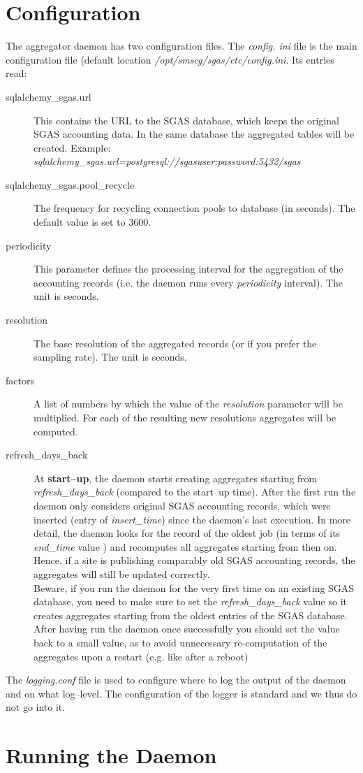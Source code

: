 \section{Configuration}
\label{configuration}
The aggregator daemon has two configuration files.
The \emph{config. ini}  file is the main configuration file  (default location 
\emph{/opt/smscg/\-sgas/etc/config.ini}. Its  entries read:
\begin{description}

\item[sqlalchemy\_sgas.url] This contains the URL to the SGAS database, which keeps the original SGAS accounting data. In the same database the aggregated tables will be created. Example: \emph{sqlalchemy\_sgas.url=postgresql://sgasuser:password\@host:5432/sgas} 
\item[sqlalchemy\_sgas.pool\_recycle] The frequency for recycling connection pools to database (in seconds). The default value is set to 3600.
\item[periodicity] This parameter defines the processing interval for the aggregation of the accounting records (i.e. the daemon 
runs every \emph{periodicity} interval). The unit is seconds. 
\item[resolution] The base resolution of the aggregated records (or if you prefer the sampling rate). The unit is seconds.
\item[factors]  A list of numbers by which the  value of the \emph{resolution} parameter will be multiplied. For each of the resulting new resolutions aggregates will be computed. 
\item[refresh\_days\_back] At \textbf{start--up}, the daemon starts creating aggregates starting from \emph{refresh\_days\_back} (compared to the start--up time). After the first run the daemon only considers  original SGAS accounting records, which were inserted (entry of \emph{insert\_time}) since the daemon's last execution. In more detail,  the daemon looks for the record of the oldest job (in terms of its  \emph{end\_time} value ) and recomputes all aggregates starting from then on. Hence, if a site is publishing  comparably old SGAS accounting records, the aggregates will still be updated correctly. \\
Beware, if you run the daemon for the very first time on an existing SGAS database, you need to make sure to set the \emph{refresh\_days\_back} value so it creates aggregates starting from the oldest entries of the SGAS database. After having run the daemon once successfully you should set the value back to a small value, as to avoid unnecessary re-computation of the aggregates upon a restart (e.g.  like after a reboot)
\end{description}
 The \emph{logging.conf} file is used to configure where to log the output of the daemon and on what log--level.  The configuration of the logger is standard and we thus do not go into it.\\\section{Running the Daemon}
\label{daemon}

